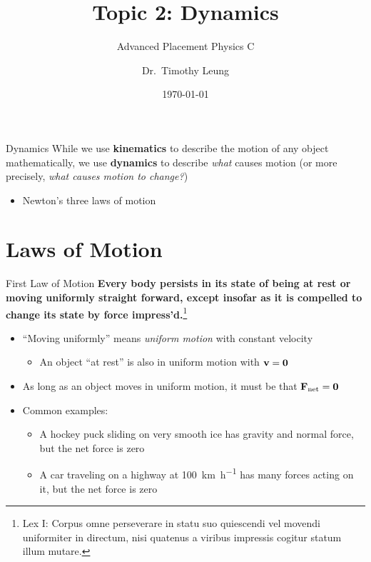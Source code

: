 \documentclass[12pt,compress,aspectratio=169]{beamer}
\title{Topic 2: Dynamics}
\subtitle{Advanced Placement Physics C}
\author[TML]{Dr.\ Timothy Leung}
\institute{Olympiads School}
\date{\today}
\newcommand{\mb}[1]{\ensuremath\mathbf{#1}}
\begin{document}
\begin{frame}
  \maketitle
\end{frame}

\begin{frame}{Dynamics}
  While we use \textbf{kinematics} to describe the motion of any object
  mathematically, we use \textbf{dynamics} to describe \emph{what} causes
  motion (or more precisely, \emph{what causes motion to change?})
  \begin{itemize}
  \item Newton's three laws of motion
  \end{itemize}
\end{frame}



\section{Laws of Motion}

\begin{frame}{First Law of Motion}
  \textbf{Every body persists in its state of being at rest or moving uniformly
    straight forward, except insofar as it is compelled to change its state by
    force impress'd.}\footnote{Lex I: Corpus omne perseverare in statu suo
    quiescendi vel movendi uniformiter in directum, nisi quatenus a viribus
    impressis cogitur statum illum mutare.}
  
  \begin{itemize}
  \item ``Moving uniformly'' means \emph{uniform motion} with constant velocity
    \begin{itemize}
    \item An object ``at rest'' is also in uniform motion with $\mb{v}=\mb{0}$
    \end{itemize}
  \item As long as an object moves in uniform motion, it must be that
    $\mb{F}_\mathrm{net}=\mb{0}$
  \item Common examples:
    \begin{itemize}
    \item A hockey puck sliding on very smooth ice has gravity and normal
      force, but the net force is zero
    \item A car traveling on a highway at \SI{100}{\kilo\metre\per\hour}
      has many forces acting on it, but the net force is zero 
    \end{itemize}
  \end{itemize}
  \vspace{.2in}
\end{frame}
\end{document}
